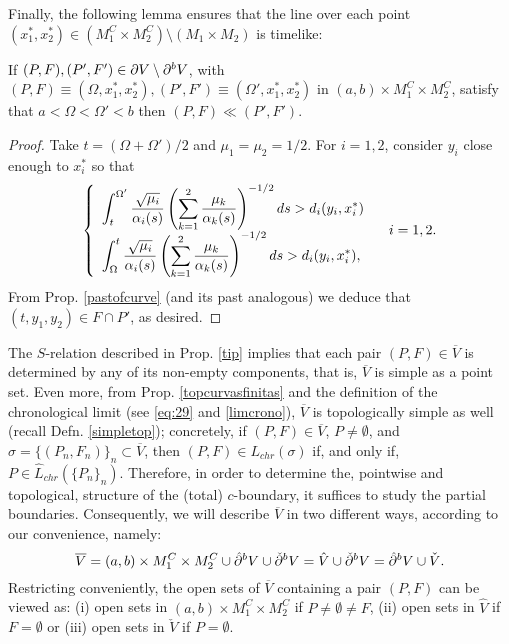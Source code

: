   Finally, the following lemma ensures that the line over each point $(x_1^*,x_2^*)\in (M_1^C\times M_2^C)\setminus (M_1\times M_2)$ is timelike:
 \begin{lemma}\label{causalstructurenoinf}
     If $(P,F),(P',F')\in \partial V\setminus \partial^{b}V$, with $(P,F)\equiv (\Omega,x^*_1,x^*_2), (P',F')\equiv (\Omega',x^*_1,x^*_2)$ in $(a,b)\times M_1^C\times M_2^C$, satisfy that $a<\Omega<\Omega'<b$ then $(P,F)\ll (P',F')$.
  \end{lemma}
  \begin{proof}
     Take $t=(\Omega+\Omega')/2$ and $\mu_1=\mu_2=1/2$. For $i=1,2$, consider $y_i$ close enough to $x_i^*$ so that
    \[
\left\{\begin{array}{l}
\displaystyle\int_{t}^{\Omega'} \frac{\sqrt{\mu_{i}}}{\alpha_{i}(s)}\left(\sum_{k=1}^{2} \frac{\mu_{k}}{\alpha_{k}(s)} \right)^{-1/2}ds>
             d_{i}(y_i,x_i^*) \\

\displaystyle\int_{\Omega}^{t} \frac{\sqrt{\mu_{i}}}{\alpha_{i}(s)}\left(\sum_{k=1}^{2} \frac{\mu_{k}}{\alpha_{k}(s)} \right)^{-1/2}ds>
             d_{i}(y_i,x_i^*),

\end{array}\right.
\quad i=1,2.
      \]
    From Prop. \ref{pastofcurve} (and its past analogous) we deduce that $(t,y_1,y_2)\in F\cap P'$, as desired.
  \end{proof}

  \smallskip

  The $S$-relation described in Prop. \ref{tip} implies that each pair $(P,F)\in\overline{V}$ is determined by any of its non-empty components, that is, $\overline{V}$ is simple as a point set. Even more, from Prop. \ref{topcurvasfinitas} and the definition of the chronological limit (see \eqref{eq:29} and \eqref{limcrono}), $\overline{V}$ is topologically simple as well (recall Defn. \ref{simpletop}); concretely, if $(P,F)\in \overline{V}$, $P\neq\emptyset$, and $\sigma=\{(P_n,F_n)\}_n\subset \overline{V}$, then $(P,F)\in L_{chr}(\sigma)$ if, and only if, $P\in \hat{L}_{chr}(\{P_n\}_n)$. Therefore, in order to determine the, pointwise and topological, structure of the (total) $c$-boundary, it suffices to study the partial boundaries. Consequently, we will describe $\overline{V}$ in two different ways, according to our convenience, namely:
  \[
\overline{V}= (a,b) \times M_1^C\times M_2^C\cup\hat{\partial}^{b}V\cup\check{\partial}^{b}V=\hat{V}\cup \check{\partial}^{b}V=\hat{\partial}^{b}V\cup \check{V}.
    \]
     Restricting conveniently, the open sets of $\overline{V}$ containing a pair $(P,F)$ can be viewed as: (i) open sets in $(a,b) \times M_1^C\times M_2^C$ if $P\neq\emptyset\neq F$, (ii) open sets in $\hat{V}$ if $F=\emptyset$ or (iii) open sets in $\check{V}$ if $P=\emptyset$.

